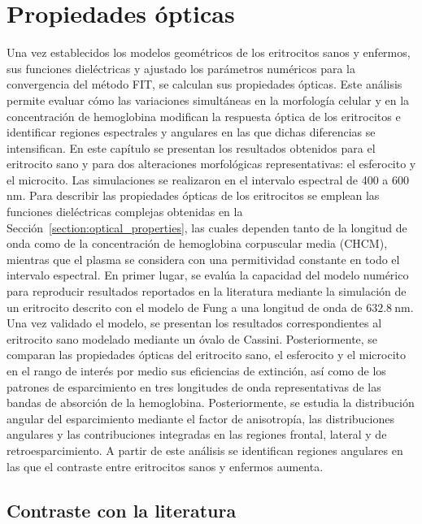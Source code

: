\chapter{Propiedades ópticas}
\label{chapter:Resultados}


Una vez establecidos los modelos geométricos de los eritrocitos sanos y enfermos, sus funciones dieléctricas y ajustado los parámetros numéricos para la convergencia del método FIT, se calculan sus propiedades ópticas. Este análisis permite evaluar cómo las variaciones simultáneas en la morfología celular y en la concentración de hemoglobina modifican la respuesta óptica de los eritrocitos e identificar regiones espectrales y angulares en las que dichas diferencias se intensifican. En este capítulo se presentan los resultados obtenidos para el eritrocito sano y para dos alteraciones morfológicas representativas: el esferocito y el microcito. Las simulaciones se realizaron en el intervalo espectral de 400 a 600 nm. Para describir las propiedades ópticas de los eritrocitos se emplean las funciones dieléctricas complejas obtenidas en la Sección~\ref{section:optical_properties}, las cuales dependen tanto de la longitud de onda como de la concentración de hemoglobina corpuscular media (CHCM), mientras que el plasma se considera con una permitividad constante en todo el intervalo espectral. En primer lugar, se evalúa la capacidad del modelo numérico para reproducir resultados reportados en la literatura mediante la simulación de un eritrocito descrito con el modelo de Fung \cite{fungBiomechanicsMechanicalProperties1990} a una longitud de onda de $632.8~\text{nm}$. Una vez validado el modelo, se presentan los resultados correspondientes al eritrocito sano modelado mediante un óvalo de Cassini. Posteriormente, se comparan las propiedades ópticas del eritrocito sano, el esferocito y el microcito en el rango de interés por medio sus eficiencias de extinción, así como de los patrones de esparcimiento en tres longitudes de onda representativas de las bandas de absorción de la hemoglobina. Posteriormente, se estudia la distribución angular del esparcimiento mediante el factor de anisotropía, las distribuciones angulares y las contribuciones integradas en las regiones frontal, lateral y de retroesparcimiento. A partir de este análisis se identifican regiones angulares en las que el contraste entre eritrocitos sanos y enfermos aumenta.

\section{Contraste con la literatura}
\label{section:Res_literatura}

